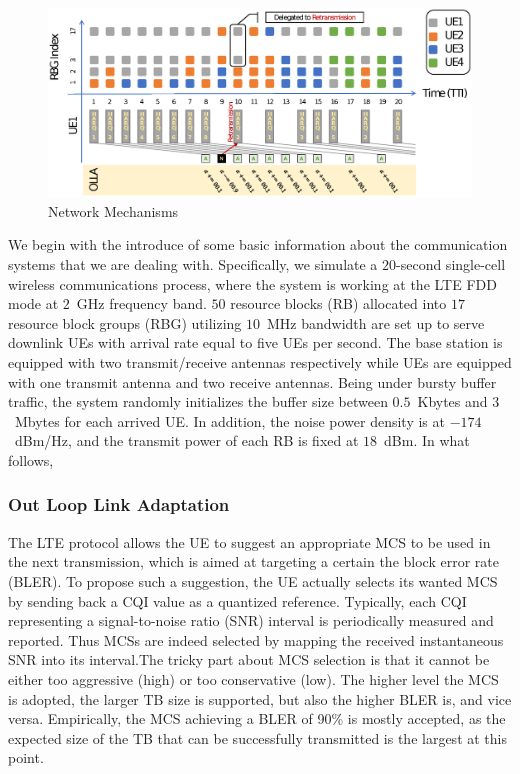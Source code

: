\documentclass[journal]{IEEEtran}
\begin{document}
\begin{figure}
	\centering
	\includegraphics[width=1\linewidth]{Figs/system.eps}
	\caption{Network Mechanisms}
	\label{sys}
\end{figure}

We begin with the introduce of some basic information about the communication systems that we are dealing with. Specifically, we simulate a $20$-second single-cell wireless communications process, where the system is working at the LTE FDD mode at $2$~GHz frequency band. $50$ resource blocks (RB) allocated into $17$ resource block groups (RBG) utilizing $10$~MHz bandwidth are set up to serve downlink UEs with arrival rate equal to five UEs per second. The base station is equipped with two transmit/receive antennas respectively while UEs are equipped with one transmit antenna and two receive antennas. Being under bursty buffer traffic, the system randomly initializes the buffer size between $0.5$~Kbytes and $3$~Mbytes for each arrived UE. In addition, the noise power density is at $-174$~dBm/Hz, and the transmit power of each RB is fixed at $18$~dBm. In what follows, 

\subsubsection{Out Loop Link Adaptation}
The LTE protocol allows	the UE to suggest an appropriate MCS to be used in the next transmission, which is aimed at targeting a certain the block error rate (BLER). To propose such a suggestion, the UE actually selects its wanted MCS by sending back a CQI value as a quantized reference. Typically, each CQI representing a signal-to-noise ratio (SNR) interval is periodically measured and reported. Thus MCSs are indeed selected by mapping the received instantaneous SNR into its interval.The tricky part about MCS selection is that it cannot be either too aggressive (high) or too conservative (low). The higher level the MCS is adopted, the larger TB size is supported, but also the higher BLER is, and vice versa. Empirically, the MCS achieving a BLER of 90\% is mostly accepted, as the expected size of the TB that can be successfully transmitted is the largest at this point. 
\end{document}
